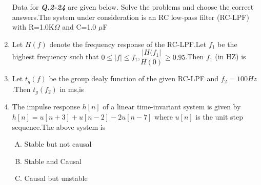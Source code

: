 \documentclass[journal,12pt,twocolumn]{IEEEtran}
\begin{document}
\begin{enumerate}
Data for \textbf{\textit{Q.2-24}} are given below. Solve the problems and choose the correct answers.\newline The system under consideration is an RC low-pass filter (RC-LPF) with R=1.0K$\Omega$ and C=1.0 $\mu$F

\item Let $H(f)$ denote the frequency response of the RC-LPF.Let $f_1$ be the highest frequency such that $0\leq |f| \leq f_1$,$\dfrac{|H(f_1|}{H(0)}\geq 0.95$.Then $f_1$ (in HZ) is
\begin{enumerate}[(A)]
\end{enumerate}

\item Let $t_g(f)$ be the group dealy function of the given RC-LPF and $f_2=100 Hz$.Then $t_g(f_2)$ in ms,is\\

\begin{enumerate}[(A)]
\end{enumerate}

\item The impulse response $h[n]$ of a linear time-invariant system is given by $h[n]=u[n+3]+u[n-2]-2u[n-7]$ \newline where $u[n]$ is the unit step sequence.The above system is\\
\begin{enumerate}[(A)]
\setlength\itemsep{2em}
\item 
Stable but not causal

\item 
Stable and Causal

\item 
Causal but unstable


\end{enumerate}
\end{enumerate}
\end{document}
